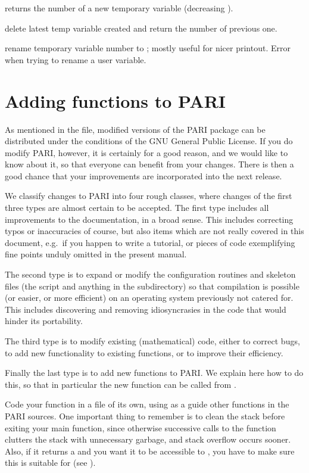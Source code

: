 
 returns the number of a new temporary variable
(decreasing ).

 delete latest temp variable created and return
the number of previous one.

 rename temporary variable number
 to ; mostly useful for nicer printout. Error when trying to
rename a user variable.

\section{Adding functions to PARI}
%
As mentioned in the  file, modified versions of the PARI package
can be distributed under the conditions of the GNU General Public License. If
you do modify PARI, however, it is certainly for a good reason, and we
would like to know about it, so that everyone can benefit from your changes.
There is then a good chance that your improvements are incorporated into the
next release.

We classify changes to PARI into four rough classes, where changes of the
first three types are almost certain to be accepted. The first type includes
all improvements to the documentation, in a broad sense. This includes
correcting typos or inaccuracies of course, but also items which are not
really covered in this document, e.g.~if you happen to write a tutorial,
or pieces of code exemplifying fine points unduly omitted in the present
manual.

The second type is to expand or modify the configuration routines and skeleton
files (the  script and anything in the 
subdirectory) so that compilation is possible (or easier, or more efficient)
on an operating system previously not catered for. This includes discovering
and removing idiosyncrasies in the code that would hinder its portability.

The third type is to modify existing (mathematical) code, either to correct
bugs, to add new functionality to existing functions, or to improve their
efficiency.

Finally the last type is to add new functions to PARI. We explain here how
to do this, so that in particular the new function can be called from .

\label{se:coding_guidelines}
\noindent
Code your function in a file of its own, using as a guide other functions
in the PARI sources. One important thing to remember is to clean the stack
before exiting your main function, since otherwise successive calls to
the function clutters the stack with unnecessary garbage, and stack
overflow occurs sooner. Also, if it returns a  and you want it
to be accessible to , you have to make sure this  is
suitable for  (see ).

